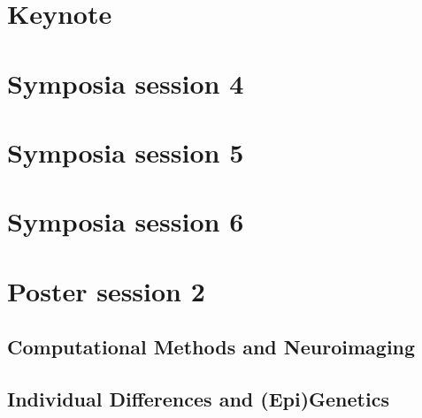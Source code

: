 
\section{Keynote}
% 

\newpage

\section{Symposia session 4}

\newpage

\section{Symposia session 5}


\newpage

\section{Symposia session 6}

\newpage

\section{Poster session 2}

\subsection*{Computational Methods and Neuroimaging}

% 
% 
% 
% 
% 
% 
% 
% 
% 
% 
% 

\subsection*{Individual Differences and (Epi)Genetics}

% 
% 
% 
% 
% 
% 
% 
% 
% 
% 

